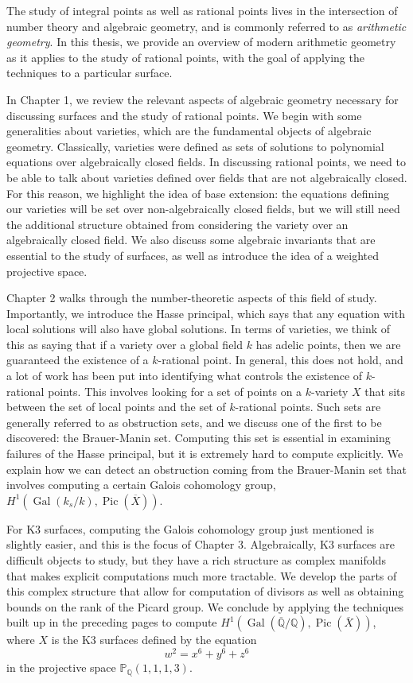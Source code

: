 \documentclass[12pt,twoside]{reedthesis}
\theoremstyle{plain}
\theoremstyle{definition}
\theoremstyle{remark}
\newcommand{\QQ}{\mathbb{Q}}
\newcommand{\Proj}{\mathbb{P}}
\newcommand{\Pic}{\operatorname{Pic}}
\newcommand{\Gal}{\operatorname{Gal}}
\begin{document}
The study of integral points as well as rational points lives in the intersection of number theory and algebraic geometry, and is commonly referred to as \emph{arithmetic geometry}. In this thesis, we provide an overview of modern arithmetic geometry as it applies to the study of rational points, with the goal of applying the techniques to a particular surface.

In Chapter 1, we review the relevant aspects of algebraic geometry necessary for discussing surfaces and the study of rational points. We begin with some generalities about varieties, which are the fundamental objects of algebraic geometry. Classically, varieties were defined as sets of solutions to polynomial equations over algebraically closed fields. In discussing rational points, we need to be able to talk about varieties defined over fields that are not algebraically closed. For this reason, we highlight the idea of base extension: the equations defining our varieties will be set over non-algebraically closed fields, but we will still need the additional structure obtained from considering the variety over an algebraically closed field. We also discuss some algebraic invariants that are essential to the study of surfaces, as well as introduce the idea of a weighted projective space.

Chapter 2 walks through the number-theoretic aspects of this field of study. Importantly, we introduce the Hasse principal, which says that any equation with local solutions will also have global solutions. In terms of varieties, we think of this as saying that if a variety over a global field $k$ has adelic points, then we are guaranteed the existence of a $k$-rational point. In general, this does not hold, and a lot of work has been put into identifying what controls the existence of $k$-rational points. This involves looking for a set of points on a $k$-variety $X$ that sits between the set of local points and the set of $k$-rational points. Such sets are generally referred to as obstruction sets, and we discuss one of the first to be discovered: the Brauer-Manin set. Computing this set is essential in examining failures of the Hasse principal, but it is extremely hard to compute explicitly. We explain how we can detect an obstruction coming from the Brauer-Manin set that involves computing a certain Galois cohomology group, $H^1(\Gal(k_s/k),\Pic(\overline{X}))$. 

For K3 surfaces, computing the Galois cohomology group just mentioned is slightly easier, and this is the focus of Chapter 3. Algebraically, K3 surfaces are difficult objects to study, but they have a rich structure as complex manifolds that makes explicit computations much more tractable. We develop the parts of this complex structure that allow for computation of divisors as well as obtaining bounds on the rank of the Picard group. We conclude by applying the techniques built up in the preceding pages to compute $H^1(\Gal(\overline{\QQ}/\QQ),\Pic(\overline{X}))$, where $X$ is the K3 surfaces defined by the equation
\[
w^2=x^6+y^6+z^6
\]
in the projective space $\Proj_\QQ(1,1,1,3)$.
\end{document}
